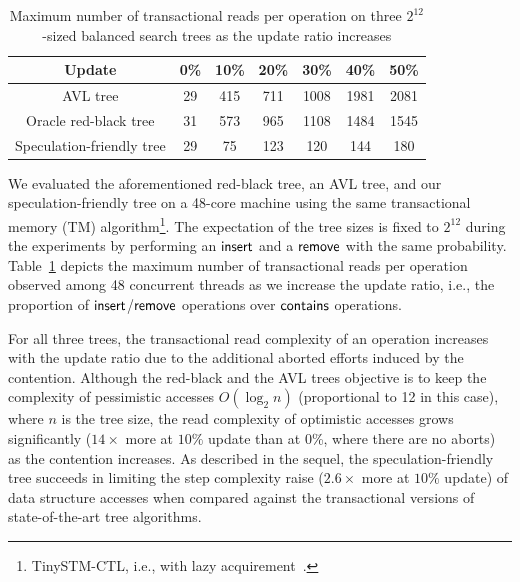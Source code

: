 \begin{table}[!ht]
 \centering
	\begin{tabular}{|c|c|c|c|c|c|c|}
  \hline
  Update & 0\% & 10\% & 20\% & 30\% & 40\% & 50\%\\  \hline\hline
  AVL tree & 29 & 415 & 711 & 1008 & 1981 & 2081  \\ \hline
  Oracle red-black tree & 31 & 573 & 965 & 1108 & 1484 & 1545   \\ \hline
  Speculation-friendly tree & 29 & 75 & 123  & 120 & 144 & 180   \\ \hline
 \end{tabular}
 \caption{Maximum number of transactional reads per operation on three $2^{12}$-sized balanced search trees as the update ratio increases}
 \label{table:complexity}
\end{table}

We evaluated the aforementioned red-black tree, an AVL tree, 
and our speculation-friendly tree on a 48-core machine using the same transactional memory (TM) algorithm\footnote{TinySTM-CTL, i.e., with lazy 
acquirement~\cite{FFR08}.}.
The expectation of the tree sizes is fixed to $2^{12}$ during the experiments by performing an 
$\lit{insert}$ and a $\lit{remove}$ with the same probability.
Table~\ref{table:complexity} depicts the maximum number of transactional reads
per operation observed among 48 concurrent threads as we increase the update ratio, i.e., the proportion of $\lit{insert}$/$\lit{remove}$ operations over $\lit{contains}$ operations.

For all three trees, the transactional read complexity of an operation increases with the update ratio due to the additional aborted efforts induced by the 
contention. 
Although the red-black and the AVL trees objective is to keep the complexity of pessimistic accesses $O(\log_2 n)$ (proportional to 12 in this case), where $n$ is the tree size,
the read complexity of optimistic accesses grows significantly ($14\times$ more at $10\%$ update than at 0\%, where there are no aborts) as the contention increases.
As described in the sequel, the speculation-friendly tree succeeds in limiting the step complexity raise ($2.6\times$ more at $10\%$ update) of data structure accesses when 
compared against the transactional versions of state-of-the-art tree algorithms.


